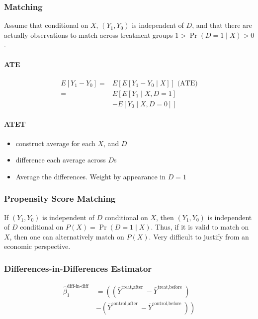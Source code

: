 \subsubsection{Matching}

Assume that conditional on $X$, $(Y_1, Y_0)$ is independent of $D$, and that there are actually observations to match across treatment groups $1>\operatorname{Pr}(D=1 \mid X)>0$.

\paragraph{ATE}

\begin{align*}
    E\left[Y_1-Y_0\right] =& E\left[E\left[Y_1-Y_0 \mid X\right]\right]  \text{ (ATE)} \\
    =& E\left[E\left[Y_1 \mid X, D=1\right]\right. \\
     &\left.-E\left[Y_0 \mid X, D=0\right]\right] 
\end{align*}

\paragraph{ATET}

\begin{itemize}
    \item construct average for each $X$, and $D$
    \item difference each average across $D$s
    \item Average the differences. Weight by appearance in $D=1$
\end{itemize}

\subsubsection{Propensity Score Matching}

If $\left(Y_1, Y_0\right)$ is independent of $D$ conditional on $X$, then $\left(Y_1, Y_0\right)$ is independent of $D$ conditional on $P(X)=\operatorname{Pr}(D=1 \mid X)$.
Thus, if it is valid to match on $X$, then one can alternatively match on $P(X)$.
Very difficult to justify from an economic perspective.

\subsubsection{Differences-in-Differences Estimator}

\begin{align*}
    \widehat{\beta}_1^{\text {diff-in-diff }} &= \left(\left(\bar{Y}^{\text {treat,after }}-\bar{Y}^{\text {treat,before }}\right) \right. \\
    & \left.-\left(\bar{Y}^{\text {control,after }}-\bar{Y}^{\text {control,before }}\right)\right)
\end{align*}

